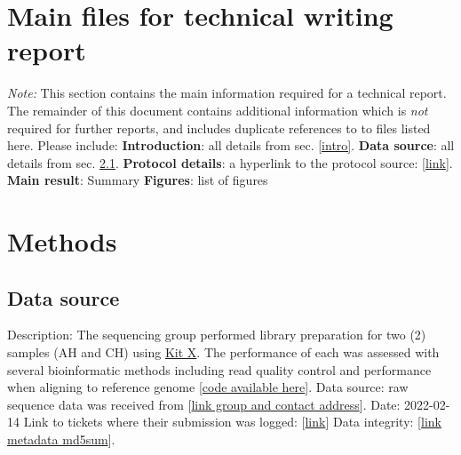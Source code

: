 \section{Main files for technical writing report} \textit{Note:} This section contains the main information required for a technical report. The remainder of this document contains additional information which is \textit{not} required for further reports, and includes duplicate references to to files listed here. Please include:\markdownRendererInterblockSeparator
{}\markdownRendererUlBeginTight
\markdownRendererUlItem \textbf{Introduction}: all details from sec. \ref{intro}.\markdownRendererUlItemEnd 
\markdownRendererUlItem \textbf{Data source}: all details from sec. \ref{data_source}.\markdownRendererUlItemEnd 
\markdownRendererUlItem \textbf{Protocol details}: a hyperlink to the protocol source: [\href{https://github.com/DylanLawless/kit_assess/README.md}{link}].\markdownRendererUlItemEnd 
\markdownRendererUlItem \textbf{Main result}: Summary\markdownRendererUlItemEnd 
\markdownRendererUlItem \textbf{Figures}: list of figures\markdownRendererUlItemEnd 
\markdownRendererUlEndTight \markdownRendererInterblockSeparator
{}\section{Methods} \subsection{Data source} \label{data_source}\markdownRendererInterblockSeparator
{}\markdownRendererUlBeginTight
\markdownRendererUlItem Description: The sequencing group performed library preparation for two (2) samples (AH and CH) using \href{https://www.sophiagenetics.com/clinical/oncology/solid-tumors/}{Kit X}. The performance of each was assessed with several bioinformatic methods including read quality control and performance when aligning to reference genome [\href{https://github.com/DylanLawless/kit_assess}{code available here}].\markdownRendererUlItemEnd 
\markdownRendererUlItem Data source: raw sequence data was received from [\href{https://www.sophiagenetics.com}{link group and contact address}].\markdownRendererUlItemEnd 
\markdownRendererUlItem Date: 2022-02-14\markdownRendererUlItemEnd 
\markdownRendererUlItem Link to tickets where their submission was logged: [\href{https://www.sophiagenetics.com}{link}]\markdownRendererUlItemEnd 
\markdownRendererUlItem Data integrity: [\href{https://github.com/DylanLawless/kit_assess/src/metadata/raw.md5sum}{link metadata md5sum}].\markdownRendererUlItemEnd 
